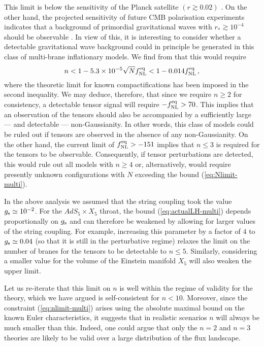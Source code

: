 This limit is below the sensitivity of the Planck satellite 
$(r \gtrsim 0.02 )$ \cite{planck}. On the other hand, 
the projected sensitivity of future CMB polarisation experiments 
indicates that a background of primordial 
gravitational waves with $r_* \gtrsim 10^{-4}$ 
should be observable \cite{songknox,vpj, Baumann:2008aq}. In view of this, 
it is interesting to consider whether
a detectable gravitational wave background could in principle 
be generated in this class of multi-brane inflationary 
models. We find from  that this would require 
% 
\begin{equation}
\label{eq:nlimit-multi}
n < 1 -5.3 \times 10^{-5} \sqrt{N} f_{\mathrm{NL}}^{\mathrm{eq}} < 1-0.014 f_{\mathrm{NL}}^{\mathrm{eq}} \,,
\end{equation}
% 
where the theoretic limit  for 
known compactifications has been imposed in the 
second inequality. We may deduce, therefore, that  
since we require $n \ge 2$ for consistency, a detectable tensor 
signal will require $-f_{\mathrm{NL}}^{\mathrm{eq}} >70$. This implies that an observation of 
the tensors should also be 
accompanied by a sufficiently large --- and detectable --- non-Gaussianity. 
In other words, this class of models could  
be ruled out if tensors are observed in the absence of any
non-Gaussianity. On the other hand, the current 
limit of  $f_{\mathrm{NL}}^{\mathrm{eq}} >-151$ implies that $n \le 3$ is required 
for the tensors to be observable. 
Consequently, if tensor perturbations are detected, this would rule 
out all models with $n \ge  4$ or, alternatively, would require presently 
unknown configurations with $N$ exceeding the bound (\ref{eq:Nlimit-multi}). 


In the above analysis we assumed that the string coupling 
took the value $g_\mathrm{s} \simeq 10^{-2}$. For the $AdS_5 \times X_5$ throat, 
the bound (\ref{eq:actualLH-multi}) depends proportionally on $g_\mathrm{s}$ and can 
therefore be weakened by allowing for larger values of the string coupling. 
For example, increasing this parameter by a factor of $4$ 
to $g_\mathrm{s} \simeq 0.04$ (so that it is still in the perturbative regime)
relaxes the limit on the number of branes for the tensors to be detectable to 
$n \le 5$. Similarly, considering a smaller value for the 
volume of the Einstein manifold $X_5$ will also weaken the upper limit. 


Let us re-iterate that this limit on $n$ is well within the 
regime of validity for the theory, which we have argued is 
self-consistent for $n<10$. Moreover, since the constraint (\ref{eq:nlimit-multi})
arises using the absolute maximal bound on the known 
Euler characteristics, it suggests that in realistic scenarios $n$ will 
always be much smaller than this. Indeed, one could argue that 
only the $n=2$ and $n=3$ theories are
likely to be valid over a large distribution of the flux landscape. 


